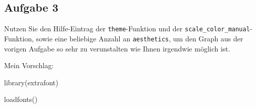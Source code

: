 \documentclass[
]{book}
\newenvironment{Shaded}{\begin{snugshade}}{\end{snugshade}}
\newcommand{\FunctionTok}[1]{\textcolor[rgb]{0.00,0.00,0.00}{#1}}
\newcommand{\NormalTok}[1]{#1}
\begin{document}
\hypertarget{aufgabe-3-3}{%
\subsection{Aufgabe 3}\label{aufgabe-3-3}}

Nutzen Sie den Hilfe-Eintrag der \texttt{theme}-Funktion und der \texttt{scale\_color\_manual}-Funktion, sowie eine beliebige Anzahl an \texttt{aesthetics}, um den Graph aus der vorigen Aufgabe so sehr zu verunstalten wie Ihnen irgendwie möglich ist.

\leavevmode\hypertarget{solution3}{}%
Mein Vorschlag:

\begin{Shaded}
\begin{Highlighting}[]
\FunctionTok{library}\NormalTok{(extrafont)}

\FunctionTok{loadfonts}\NormalTok{()}


\end{Highlighting}
\end{Shaded}
\end{document}
